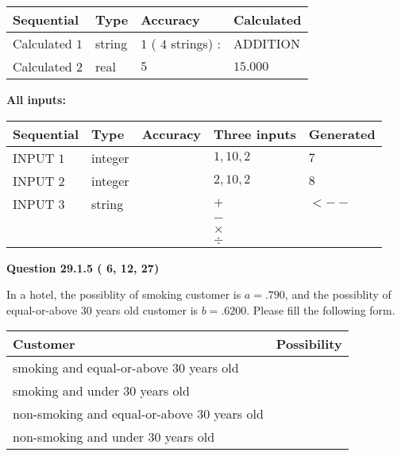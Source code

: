 \documentclass[12pt]{article}
\begin{document}
  
\noindent\begin{tabular}{|l|l|l|l|}
\hline
 Sequential & Type & Accuracy & Calculated \\ 
\hline
 
 
  Calculated $           1$ & string & $           1 $ ( $          4 $ strings)
 : 
 & ADDITION
 \\  \hline  
 
 
  Calculated $           2$ & real & $           5 $ & 
 $ 15.000 $ 
 \\  \hline  
 \end{tabular}
   
   
   
   
\noindent\vspace{0.1in}\hspace{-0.08in} {\textbf{\Large{All inputs: }}}
   
   
  
  
\noindent\begin{tabular}{|l|l|l|l|l|}
\hline
 Sequential & Type & Accuracy & Three inputs & Generated \\ 
\hline
 
 
  INPUT $           1$ & integer &  & $
 1
 , 
 10
 , 
 2
 $ & $ 7 $ 
 \\  \hline  
 
 
  INPUT $           2$ & integer &  & $
 2
 , 
 10
 , 
 2
 $ & $ 8 $ 
 \\  \hline  
 
 
  INPUT $           3$ & string & & 
 $+$ & 
  $ <-- $ 
  \\
  & & & 
 $-$ & 
  \\
  & & & 
 $\times$ & 
  \\
  & & & 
 $\div$ & 
 \\  \hline  
 \end{tabular}
   
   
  
\vspace{0.2in}
  
{\textbf{\Large{Question
29.1.5 
 (          6,         12,         27)
}}}
  
  
In a hotel, the possiblity of  %
smoking customer is
$a =  %
.790$, and the possiblity of  %
equal-or-above 30 years old customer is $ b =  %
.6200$.
Please fill the following form.
 
\noindent
\begin{tabular}{|l|l|}
\hline
Customer & Possibility \\
\hline
smoking  and   %
equal-or-above 30 years old  & \\
\hline
smoking  and   %
under 30 years old & \\
\hline
 non-smoking and   %
equal-or-above 30 years old  & \\
\hline
 non-smoking and  %
under 30 years old & \\
\hline
\end{tabular}
 
\end{document}
